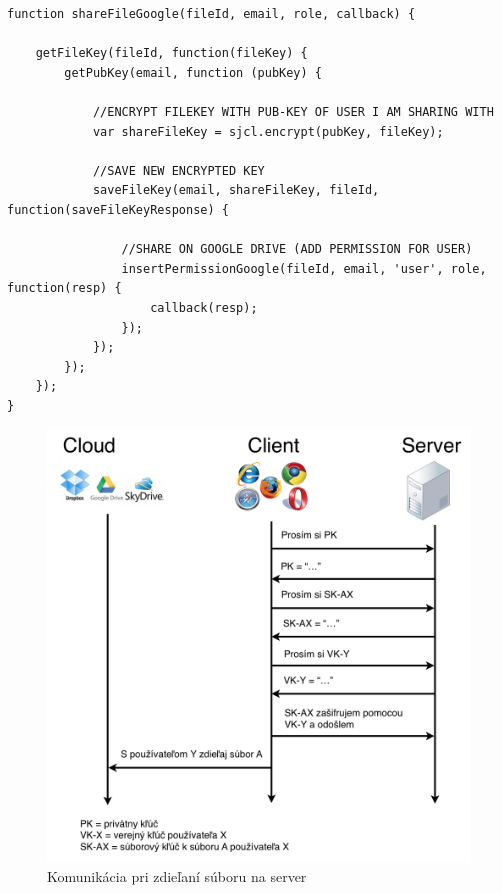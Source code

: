 		
\begin{lstlisting}[caption=Zdieľanie súboru]	
function shareFileGoogle(fileId, email, role, callback) {

    getFileKey(fileId, function(fileKey) {
        getPubKey(email, function (pubKey) {

            //ENCRYPT FILEKEY WITH PUB-KEY OF USER I AM SHARING WITH
            var shareFileKey = sjcl.encrypt(pubKey, fileKey);

            //SAVE NEW ENCRYPTED KEY
            saveFileKey(email, shareFileKey, fileId, function(saveFileKeyResponse) {

                //SHARE ON GOOGLE DRIVE (ADD PERMISSION FOR USER)
                insertPermissionGoogle(fileId, email, 'user', role, function(resp) {
                    callback(resp);
                });
            });
        });
    });
}
\end{lstlisting}		
	
		\begin{figure}[H]
			\begin{center}
				\includegraphics[width=1\linewidth]{images/zdielanie_com.png}
				\caption{Komunikácia pri zdieľaní súboru na server}
			\end{center}
		\end{figure}
	
